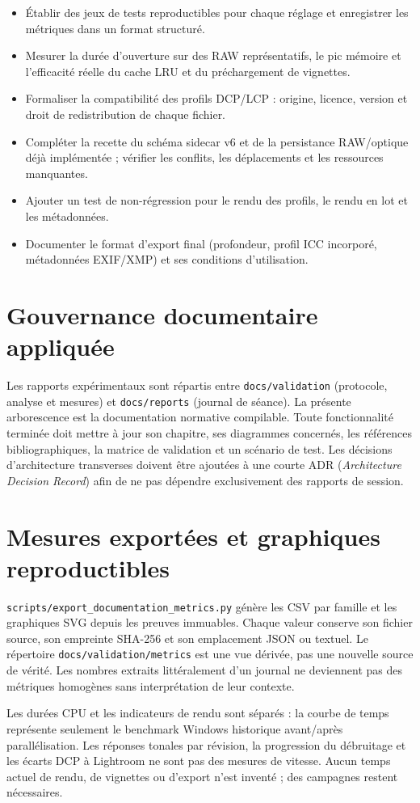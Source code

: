 \begin{itemize}
  \item Établir des jeux de tests reproductibles pour chaque réglage et enregistrer les métriques dans un format structuré.
  \item Mesurer la durée d'ouverture sur des RAW représentatifs, le pic mémoire et l'efficacité réelle du cache LRU et du préchargement de vignettes.
  \item Formaliser la compatibilité des profils DCP/LCP : origine, licence, version et droit de redistribution de chaque fichier.
  \item Compléter la recette du schéma sidecar v6 et de la persistance RAW/optique déjà implémentée ; vérifier les conflits, les déplacements et les ressources manquantes.
  \item Ajouter un test de non-régression pour le rendu des profils, le rendu en lot et les métadonnées.
  \item Documenter le format d'export final (profondeur, profil ICC incorporé, métadonnées EXIF/XMP) et ses conditions d'utilisation.
\end{itemize}

\section{Gouvernance documentaire appliquée}

Les rapports expérimentaux sont répartis entre \texttt{docs/validation} (protocole, analyse et mesures) et \texttt{docs/reports} (journal de séance). La présente arborescence est la documentation normative compilable. Toute fonctionnalité terminée doit mettre à jour son chapitre, ses diagrammes concernés, les références bibliographiques, la matrice de validation et un scénario de test. Les décisions d'architecture transverses doivent être ajoutées à une courte ADR (\emph{Architecture Decision Record}) afin de ne pas dépendre exclusivement des rapports de session.

\section{Mesures exportées et graphiques reproductibles}

\texttt{scripts/export\_documentation\_metrics.py} génère les CSV par famille
et les graphiques SVG depuis les preuves immuables. Chaque valeur conserve
son fichier source, son empreinte SHA-256 et son emplacement JSON ou textuel.
Le répertoire \texttt{docs/validation/metrics} est une vue dérivée, pas une
nouvelle source de vérité. Les nombres extraits littéralement d'un journal
ne deviennent pas des métriques homogènes sans interprétation de leur contexte.

Les durées CPU et les indicateurs de rendu sont séparés : la courbe de temps
représente seulement le benchmark Windows historique avant/après parallélisation.
Les réponses tonales par révision, la progression du débruitage et les écarts
DCP à Lightroom ne sont pas des mesures de vitesse. Aucun temps actuel de
rendu, de vignettes ou d'export n'est inventé ; des campagnes restent nécessaires.
